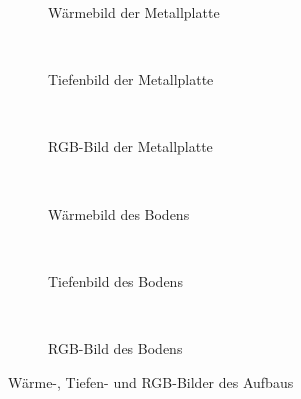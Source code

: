 \begin{figure}[t]
	\begin{subfigure}[t]{0.45\textwidth}
		\centering
		\caption{Wärmebild der Metallplatte}
		\label{fig:study1_heat0}
	\end{subfigure}
	~
	\begin{subfigure}[t]{0.45\textwidth}
		\centering
		\caption{Tiefenbild der Metallplatte}
		\label{fig:study1_depth0}
	\end{subfigure}
	~
	\begin{subfigure}[t]{0.45\textwidth}
		\centering
		\caption{RGB-Bild der Metallplatte}
		\label{fig:study1_rgb0}
	\end{subfigure}
	~
	\begin{subfigure}[t]{0.45\textwidth}
		\centering
		\caption{Wärmebild des Bodens}
		\label{fig:study1_heat1}
	\end{subfigure}
	~
	\begin{subfigure}[t]{0.45\textwidth}
		\centering
		\caption{Tiefenbild des Bodens}
		\label{fig:study1_depth1}
	\end{subfigure}
	~
	\begin{subfigure}[t]{0.45\textwidth}
		\centering
		\caption{RGB-Bild des Bodens}
		\label{fig:study1_rgb1}
	\end{subfigure}
	\caption{Wärme-, Tiefen- und RGB-Bilder des Aufbaus}
	\label{fig:study1_modes}
\end{figure}

